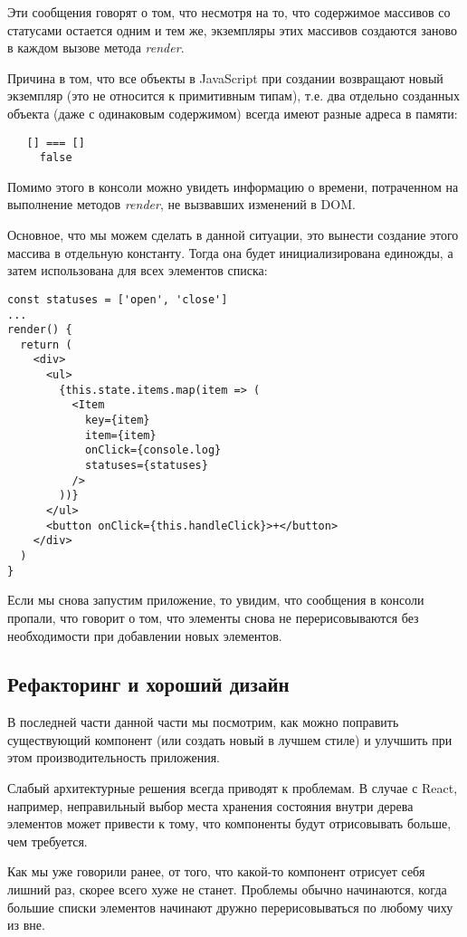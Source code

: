 Эти сообщения говорят о том, что несмотря на то, что содержимое массивов со статусами остается одним и тем же, экземпляры этих массивов создаются заново в каждом вызове метода \textit{render}.

Причина в том, что все объекты в JavaScript при создании возвращают новый экземпляр (это не относится к примитивным типам), т.е. два отдельно созданных объекта (даже с одинаковым содержимом) всегда имеют разные адреса в памяти:

\begin{lstlisting}
   [] === []
     false
\end{lstlisting}

Помимо этого в консоли можно увидеть информацию о времени, потраченном на выполнение методов \textit{render}, не вызвавших изменений в DOM.

Основное, что мы можем сделать в данной ситуации, это вынести создание этого массива в отдельную константу. Тогда она будет инициализирована единожды, а затем использована для всех элементов списка:

\begin{lstlisting}
const statuses = ['open', 'close']
...
render() {
  return (
    <div>
      <ul>
        {this.state.items.map(item => (
          <Item
            key={item}
            item={item}
            onClick={console.log}
            statuses={statuses}
          />
        ))}
      </ul>
      <button onClick={this.handleClick}>+</button>
    </div>
  )
}
\end{lstlisting}

Если мы снова запустим приложение, то увидим, что сообщения в консоли пропали, что говорит о том, что элементы снова не перерисовываются без необходимости при добавлении новых элементов.

\subsection{Рефакторинг и хороший дизайн}

В последней части данной части мы посмотрим, как можно поправить существующий компонент (или создать новый в лучшем стиле) и улучшить при этом производительность приложения.

Слабый архитектурные решения всегда приводят к проблемам. В случае с React, например, неправильный выбор места хранения состояния внутри дерева элементов может привести к тому, что компоненты будут отрисовывать больше, чем требуется.

Как мы уже говорили ранее, от того, что какой-то компонент отрисует себя лишний раз, скорее всего хуже не станет. Проблемы обычно начинаются, когда большие списки элементов начинают дружно перерисовываться по любому чиху из вне.

